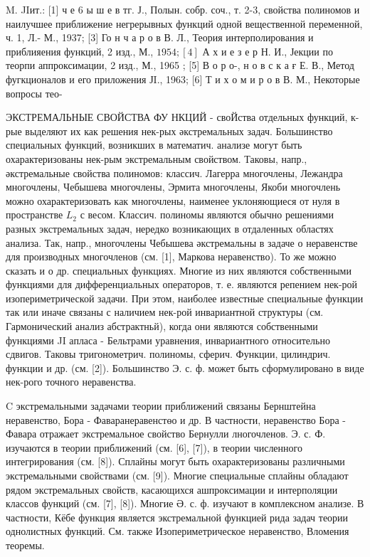 \documentclass[10pt]{article}
\begin{document}
M. JIит.: [1] ч е 6 ы ш е в тг. Ј., Полын. собр. соч., т. 2-3, свойства полиномов и наилучшее приближение негрерывных функций одной вещественной переменной, ч. 1, Л.- М., 1937; [3] Го н ч а р о в В. Л., Теория интерполирования и приблияения функций, 2 изд., М., $1954 ;[4]$ А х и е з е р Н. И., Јекции по теорпи аппроксимации, 2 изд., М., 1965 ; [5] В о р о-, н о в с к а ғ Е. В., Метод фугкционалов и его приложения ЈI., 1963; [6] Т и х о м и р о в В. М., Некоторые вопросы тео-



ЭКСТРЕМАЛЬНЫЕ СВОЙСТВА ФУ НКЦИЙ - своЙства отдельных функций, к-рые выделяют их как решения нек-рых әкстремальных задач. Большинство специальных функций, возникших в математич. анализе могут быть охарактеризованы нек-рым экстремальным свойством. Таковы, напр., әкстремальные свойства полиномов: классич. Лагерра многочлены, Лежандра многочлены, Чебышева многочлены, Эрмита многочлены, Якоби многочлень можно охарактеризовать как многочлены, наименее уклоняющиеся от нуля в пространстве $L_{2}$ с весом. Классич. полиномы являются обычно решениями разных экстремальных задач, нередко возникающих в отдаленных областях анализа. Так, напр., многочлены Чебышева әкстремальны в задаче о неравенстве для производных многочленов (см. [1], Маркова неравенство). То же можно сказать и о др. специальных функциях. Многие из них являются собственными функциями для дифференциальных операторов, т. е. являются репением нек-рой изопериметрической задачи. При этом, наиболее известные специальные функции так или иначе связаны с наличием нек-рой инвариантной структуры (см. Гармонический анализ абстрактньй), когда они являются собственными функциями JI апласа - Бельтрами уравнения, инвариантного относительно сдвигов. Таковы тригонометрич. полиномы, сферич. Функции, цилиндрич. функции и др. (см. [2]). Большинство Э. с. ф. может быть сформулировано в виде нек-рого точного неравенства.



C экстремальными задачами теории приближений связаны Бернштейна неравенство, Бора - Фаваранеравенстөо и др. В частности, неравенство Бора - Фавара отражает экстремальное свойство Бернулли лногочленов. Э. с. Ф. изучаются в теории приближений (см. [6], [7]), в теории численного интегрирования (см. [8]). Сплайны могут быть охарактеризованы различными экстремальными свойствами (см. [9]). Многие специальные сплайны обладают рядом экстремальных свойств, касающихся ашпроксимации и интерполяции классов функций (см. [7], [8]). Многие Ә. с. ф. изучают в комплексном анализе. В частности, Кёбе функция является экстремальной функцией рида задач теории однолистных функций. См. также Изопериметрическое неравенство, Вломения теоремы.
\end{document}
